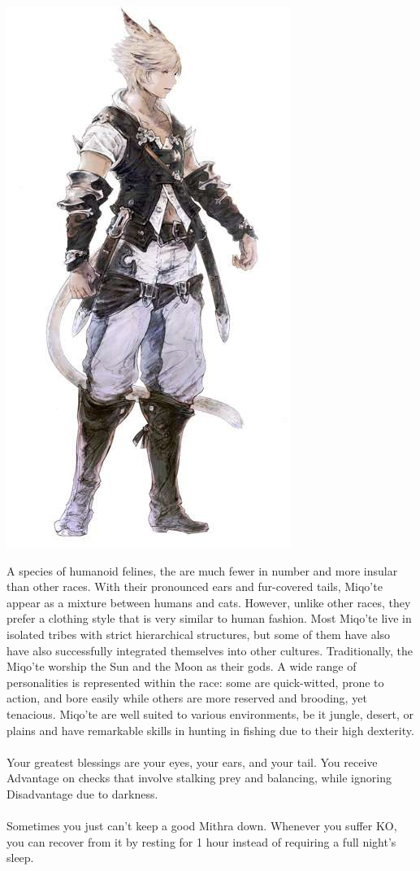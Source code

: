 \begin{center} \includegraphics[width=0.7\columnwidth]{./art/races/miqote.jpg} \end{center}
%
A species of humanoid felines, the  are much fewer in number and more insular than other races. 
With their pronounced ears and fur-covered tails, Miqo'te appear as a mixture between humans and cats.
However, unlike other races, they prefer a clothing style that is very similar to human fashion.
Most Miqo'te live in isolated tribes with strict hierarchical structures, but some of them have also have also successfully integrated themselves into other cultures.
Traditionally, the Miqo'te worship the Sun and the Moon as their gods.
A wide range of personalities is represented within the race: some are quick-witted, prone to action, and bore easily while others are more reserved and brooding, yet tenacious. 
Miqo'te are well suited to various environments, be it jungle, desert, or plains and have remarkable skills in hunting in fishing due to their high dexterity.
\\\\
 Your greatest blessings are your eyes, your ears, and your tail. 
You receive Advantage on checks that involve stalking prey and balancing, while ignoring Disadvantage due to darkness.
\\\\
 Sometimes you just can't keep a good Mithra down. 
Whenever you suffer KO, you can recover from it by resting for 1 hour instead of requiring a full night's sleep.
%
%
\clearpage
